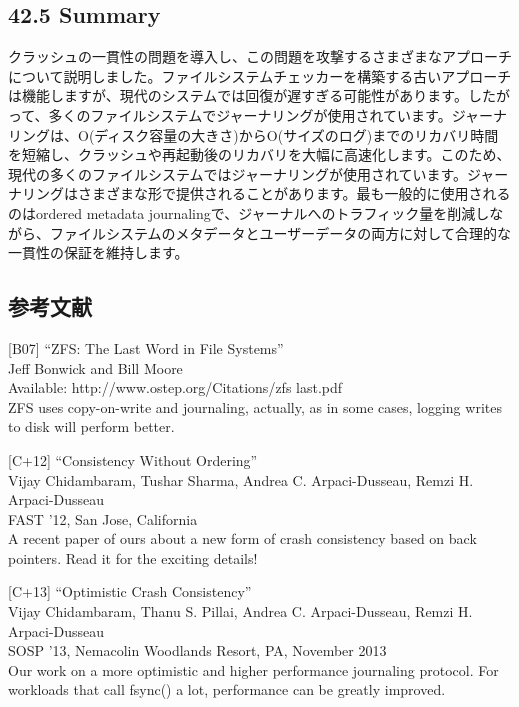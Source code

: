 \hypertarget{summary-29}{%
\subsection*{42.5 Summary}\label{summary-29}}

クラッシュの一貫性の問題を導入し、この問題を攻撃するさまざまなアプローチについて説明しました。ファイルシステムチェッカーを構築する古いアプローチは機能しますが、現代のシステムでは回復が遅すぎる可能性があります。したがって、多くのファイルシステムでジャーナリングが使用されています。ジャーナリングは、O(ディスク容量の大きさ)からO(サイズのログ)までのリカバリ時間を短縮し、クラッシュや再起動後のリカバリを大幅に高速化します。このため、現代の多くのファイルシステムではジャーナリングが使用されています。ジャーナリングはさまざまな形で提供されることがあります。最も一般的に使用されるのはordered
metadata
journalingで、ジャーナルへのトラフィック量を削減しながら、ファイルシステムのメタデータとユーザーデータの両方に対して合理的な一貫性の保証を維持します。

\hypertarget{ux53c2ux8003ux6587ux732e-29}{%
\subsection*{参考文献}\label{ux53c2ux8003ux6587ux732e-29}}

{[}B07{]} ``ZFS: The Last Word in File Systems''\\
Jeff Bonwick and Bill Moore\\
Available: http://www.ostep.org/Citations/zfs last.pdf\\
ZFS uses copy-on-write and journaling, actually, as in some cases,
logging writes to disk will perform better.

{[}C+12{]} ``Consistency Without Ordering''\\
Vijay Chidambaram, Tushar Sharma, Andrea C. Arpaci-Dusseau, Remzi H.
Arpaci-Dusseau\\
FAST '12, San Jose, California\\
A recent paper of ours about a new form of crash consistency based on
back pointers. Read it for the exciting details!

{[}C+13{]} ``Optimistic Crash Consistency''\\
Vijay Chidambaram, Thanu S. Pillai, Andrea C. Arpaci-Dusseau, Remzi H.
Arpaci-Dusseau\\
SOSP '13, Nemacolin Woodlands Resort, PA, November 2013\\
Our work on a more optimistic and higher performance journaling
protocol. For workloads that call fsync() a lot, performance can be
greatly improved.

